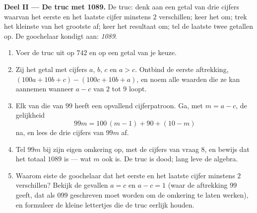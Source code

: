 \begin{problem}
\medskip
\noindent\textbf{Deel II --- De truc met 1089.}
De truc: denk aan een getal van drie cijfers waarvan het eerste en het laatste
cijfer minstens $2$ verschillen; keer het om; trek het kleinste van het grootste
af; keer het resultaat om; tel de laatste twee getallen op. De goochelaar kondigt
aan: \emph{1089}.
\begin{enumerate}[resume]
  \item Voer de truc uit op $742$ en op een getal van je keuze.
  \item Zij het getal met cijfers $a$, $b$, $c$ en $a > c$. Ontbind de eerste
        aftrekking, $(100a + 10b + c) - (100c + 10b + a)$, en noem alle waarden die
        ze kan aannemen wanneer $a - c$ van $2$ tot $9$ loopt.
  \item Elk van die  van $99$ heeft een opvallend cijferpatroon. Ga, met
        $m = a - c$, de gelijkheid
        \[
        99m = 100\,(m - 1) + 90 + (10 - m)
        \]
        na, en lees de drie cijfers van $99m$ af.
  \item Tel $99m$ bij zijn eigen omkering op, met de cijfers van vraag 8, en bewijs
        dat het totaal $1089$ is --- wat $m$ ook is. De truc is dood; lang leve de
        algebra.
  \item Waarom eiste de goochelaar dat het eerste en het laatste cijfer minstens
        $2$ verschillen? Bekijk de gevallen $a = c$ en $a - c = 1$ (waar de
        aftrekking $99$ geeft, dat als $099$ geschreven moet worden om de omkering
        te laten werken), en formuleer de kleine lettertjes die de truc eerlijk
        houden.
\end{enumerate}


\end{problem}
